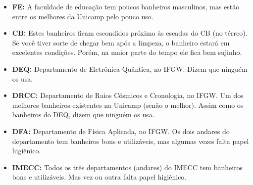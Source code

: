 \begin{itemize}
    \item  \textbf{FE:} A faculdade de educação tem poucos banheiros masculinos,
    mas estão entre os melhores da Unicamp pelo pouco uso.

    \item  \textbf{CB:} Estes banheiros ficam escondidos próximo às escadas do
    CB (no térreo). Se você tiver sorte de chegar bem após a limpeza, o banheiro
    estará em excelentes condições. Porém, na maior parte do tempo ele fica bem
    sujinho.

    \item  \textbf{DEQ:} Departamento de Eletrônica Quântica, no IFGW. Dizem que
    ninguém os usa.

    \item  \textbf{DRCC:} Departamento de Raios Cósmicos e Cronologia, no IFGW.
    Um dos melhores banheiros existentes na Unicamp (senão o melhor). Assim como
    os banheiros do DEQ, dizem que ninguém os usa.

    \item  \textbf{DFA:} Departamento de Física Aplicada, no IFGW. Os dois
    andares do departamento tem banheiros bons e utilizáveis, mas algumas vezes
    falta papel higiênico.

    \item  \textbf{IMECC:} Todos os três departamentos (andares) do IMECC tem
    banheiros bons e utilizáveis. Mas vez ou outra falta papel higiênico.
\end{itemize}

